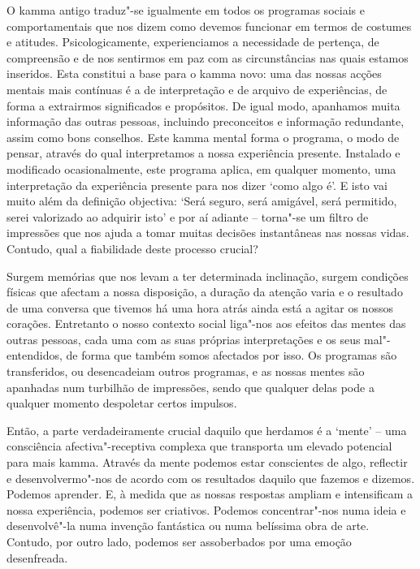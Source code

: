 O kamma antigo traduz"-se igualmente em todos os programas sociais e
comportamentais que nos dizem como devemos funcionar em termos de costumes e
atitudes. Psicologicamente, experienciamos a necessidade de pertença, de
compreensão e de nos sentirmos em paz com as circunstâncias nas quais estamos
inseridos. Esta constitui a base para o kamma novo: uma das nossas acções
mentais mais contínuas é a de interpretação e de arquivo de experiências, de
forma a extrairmos significados e propósitos. De igual modo, apanhamos muita
informação das outras pessoas, incluindo preconceitos e informação redundante,
assim como bons conselhos. Este kamma mental forma o programa, o modo de pensar,
através do qual interpretamos a nossa experiência presente. Instalado e
modificado ocasionalmente, este programa aplica, em qualquer momento, uma
interpretação da experiência presente para nos dizer `como algo é'. E isto vai
muito além da definição objectiva: `Será seguro, será amigável, será permitido,
serei valorizado ao adquirir isto' e por aí adiante -- torna"-se um filtro de
impressões que nos ajuda a tomar muitas decisões instantâneas nas nossas vidas.
Contudo, qual a fiabilidade deste processo crucial?

Surgem memórias que nos levam a ter determinada inclinação, surgem condições
físicas que afectam a nossa disposição, a duração da atenção varia e o resultado
de uma conversa que tivemos há uma hora atrás ainda está a agitar os nossos
corações. Entretanto o nosso contexto social liga"-nos aos efeitos das mentes das
outras pessoas, cada uma com as suas próprias interpretações e os seus
mal"-entendidos, de forma que também somos afectados por isso. Os programas são
transferidos, ou desencadeiam outros programas, e as nossas mentes são apanhadas
num turbilhão de impressões, sendo que qualquer delas pode a qualquer momento
despoletar certos impulsos.

Então, a parte verdadeiramente crucial daquilo que herdamos é a `mente' -- uma
consciência afectiva"-receptiva complexa que transporta um elevado potencial para
mais kamma. Através da mente podemos estar conscientes de algo, reflectir e
desenvolvermo"-nos de acordo com os resultados daquilo que fazemos e dizemos.
Podemos aprender. E, à medida que as nossas respostas ampliam e intensificam a
nossa experiência, podemos ser criativos. Podemos concentrar"-nos numa ideia e
desenvolvê"-la numa invenção fantástica ou numa belíssima obra de arte. Contudo,
por outro lado, podemos ser assoberbados por uma emoção desenfreada.

